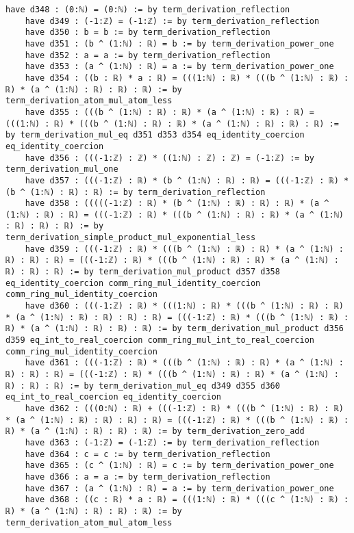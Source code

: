 \documentclass{article}
\begin{document}
\begin{tcolorbox}[colback=white!10, width=\linewidth]
\begin{lstlisting}[language=Lean4]
    have d348 : (0:ℕ) = (0:ℕ) := by term_derivation_reflection
    have d349 : (-1:ℤ) = (-1:ℤ) := by term_derivation_reflection
    have d350 : b = b := by term_derivation_reflection
    have d351 : (b ^ (1:ℕ) : ℝ) = b := by term_derivation_power_one
    have d352 : a = a := by term_derivation_reflection
    have d353 : (a ^ (1:ℕ) : ℝ) = a := by term_derivation_power_one
    have d354 : ((b : ℝ) * a : ℝ) = (((1:ℕ) : ℝ) * (((b ^ (1:ℕ) : ℝ) : ℝ) * (a ^ (1:ℕ) : ℝ) : ℝ) : ℝ) := by term_derivation_atom_mul_atom_less
    have d355 : (((b ^ (1:ℕ) : ℝ) : ℝ) * (a ^ (1:ℕ) : ℝ) : ℝ) = (((1:ℕ) : ℝ) * (((b ^ (1:ℕ) : ℝ) : ℝ) * (a ^ (1:ℕ) : ℝ) : ℝ) : ℝ) := by term_derivation_mul_eq d351 d353 d354 eq_identity_coercion eq_identity_coercion
    have d356 : (((-1:ℤ) : ℤ) * ((1:ℕ) : ℤ) : ℤ) = (-1:ℤ) := by term_derivation_mul_one
    have d357 : (((-1:ℤ) : ℝ) * (b ^ (1:ℕ) : ℝ) : ℝ) = (((-1:ℤ) : ℝ) * (b ^ (1:ℕ) : ℝ) : ℝ) := by term_derivation_reflection
    have d358 : (((((-1:ℤ) : ℝ) * (b ^ (1:ℕ) : ℝ) : ℝ) : ℝ) * (a ^ (1:ℕ) : ℝ) : ℝ) = (((-1:ℤ) : ℝ) * (((b ^ (1:ℕ) : ℝ) : ℝ) * (a ^ (1:ℕ) : ℝ) : ℝ) : ℝ) := by term_derivation_simple_product_mul_exponential_less
    have d359 : (((-1:ℤ) : ℝ) * (((b ^ (1:ℕ) : ℝ) : ℝ) * (a ^ (1:ℕ) : ℝ) : ℝ) : ℝ) = (((-1:ℤ) : ℝ) * (((b ^ (1:ℕ) : ℝ) : ℝ) * (a ^ (1:ℕ) : ℝ) : ℝ) : ℝ) := by term_derivation_mul_product d357 d358 eq_identity_coercion comm_ring_mul_identity_coercion comm_ring_mul_identity_coercion
    have d360 : (((-1:ℤ) : ℝ) * (((1:ℕ) : ℝ) * (((b ^ (1:ℕ) : ℝ) : ℝ) * (a ^ (1:ℕ) : ℝ) : ℝ) : ℝ) : ℝ) = (((-1:ℤ) : ℝ) * (((b ^ (1:ℕ) : ℝ) : ℝ) * (a ^ (1:ℕ) : ℝ) : ℝ) : ℝ) := by term_derivation_mul_product d356 d359 eq_int_to_real_coercion comm_ring_mul_int_to_real_coercion comm_ring_mul_identity_coercion
    have d361 : (((-1:ℤ) : ℝ) * (((b ^ (1:ℕ) : ℝ) : ℝ) * (a ^ (1:ℕ) : ℝ) : ℝ) : ℝ) = (((-1:ℤ) : ℝ) * (((b ^ (1:ℕ) : ℝ) : ℝ) * (a ^ (1:ℕ) : ℝ) : ℝ) : ℝ) := by term_derivation_mul_eq d349 d355 d360 eq_int_to_real_coercion eq_identity_coercion
    have d362 : (((0:ℕ) : ℝ) + (((-1:ℤ) : ℝ) * (((b ^ (1:ℕ) : ℝ) : ℝ) * (a ^ (1:ℕ) : ℝ) : ℝ) : ℝ) : ℝ) = (((-1:ℤ) : ℝ) * (((b ^ (1:ℕ) : ℝ) : ℝ) * (a ^ (1:ℕ) : ℝ) : ℝ) : ℝ) := by term_derivation_zero_add
    have d363 : (-1:ℤ) = (-1:ℤ) := by term_derivation_reflection
    have d364 : c = c := by term_derivation_reflection
    have d365 : (c ^ (1:ℕ) : ℝ) = c := by term_derivation_power_one
    have d366 : a = a := by term_derivation_reflection
    have d367 : (a ^ (1:ℕ) : ℝ) = a := by term_derivation_power_one
    have d368 : ((c : ℝ) * a : ℝ) = (((1:ℕ) : ℝ) * (((c ^ (1:ℕ) : ℝ) : ℝ) * (a ^ (1:ℕ) : ℝ) : ℝ) : ℝ) := by term_derivation_atom_mul_atom_less

\end{lstlisting}
\end{tcolorbox}
\end{document}
